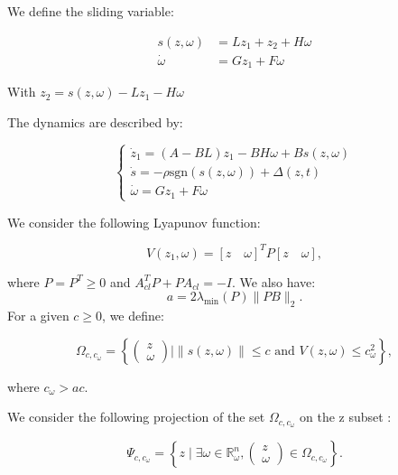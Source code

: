We define the sliding variable:

\begin{align}
    s(z, \omega) &= Lz_1 + z_2 + H\omega \\
    \dot{\omega} &= Gz_1 + F\omega
\end{align}

With \( z_2 = s(z, \omega) - Lz_1 - H\omega \)

The dynamics are described by:

\begin{equation}
    \begin{cases}
        \dot{z}_1 = (A - BL)z_1 - BH\omega + Bs(z, \omega) \\
        \dot{s} = -\rho \text{sgn}(s(z, \omega)) + \Delta(z, t) \\
        \dot{\omega} = Gz_1 + F\omega
        \label{eq:closed_loop_dynamicNiclas}
    \end{cases}
\end{equation}

We consider the following Lyapunov function:

\begin{equation}
    V(z_1, \omega) = [z \quad \omega]^T P [z \quad \omega],
    \label{eq:Lyapunov_V}
\end{equation}

where \( P = P^T \geq 0 \) and \( A_{cl}^T P + P A_{cl} = -I \).
We also have:
\begin{equation}
    a = 2 \lambda_{\min}(P) \|P B\|_2.
\end{equation}
For a given \( c \geq 0 \), we define:

\begin{equation}
    \Omega_{c, c_\omega} = \left\{ \begin{pmatrix} z \\ \omega \end{pmatrix} \mid \|s(z, \omega)\| \leq c \text{ and } V(z, \omega) \leq c_\omega^2 \right\},
\end{equation}

where \( c_\omega > a c \).

We consider the following projection of the set \( \Omega_{c, c_\omega} \) on the z subset :

\begin{equation}
    \Psi_{c, c_\omega} = \left\{ z \mid \exists \omega \in \mathbb{R}^n_{\omega}, \begin{pmatrix} z \\ \omega \end{pmatrix} \in \Omega_{c, c_\omega} \right\}.
\end{equation}

